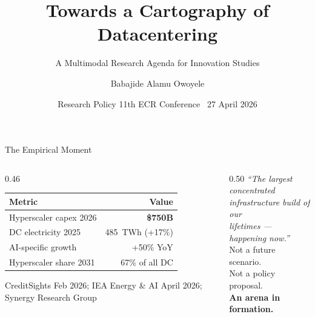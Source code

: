 \documentclass[aspectratio=169,11pt]{beamer}
\title{Towards a Cartography of Datacentering}
\subtitle{A Multimodal Research Agenda for Innovation Studies}
\author{Babajide Alamu Owoyele}
\institute{DRIFT, Erasmus University Rotterdam \textbar\ Radboud University}
\date{Research Policy 11th ECR Conference \textbar\ 27 April 2026}
\newcommand{\iconfull}[2]{\textcolor{#1}{\faIcon{#2}}}
\newcommand{\hl}[1]{\textcolor{dchighlight}{\textbf{#1}}}
\begin{document}
\begin{frame}[shrink=4]
\titlepage
\end{frame}

\begin{frame}{\iconfull{dcblue}{chart-bar}\enspace The Empirical Moment}
\begin{columns}[T]
\begin{column}{0.46\textwidth}
  \vspace{0.3em}
  \begin{tabular}{@{}lr@{}}
    \toprule
    \textbf{Metric} & \textbf{Value} \\
    \midrule
    Hyperscaler capex 2026   & \textbf{\$750B} \\
    DC electricity 2025      & 485~TWh (+17\%) \\
    AI-specific growth       & +50\% YoY \\
    Hyperscaler share 2031   & 67\% of all DC \\
    \bottomrule
  \end{tabular}
  \vspace{0.5em}

  \scriptsize\textcolor{dcgray}{CreditSights Feb 2026; IEA Energy \& AI April 2026;
  Synergy Research Group}
\end{column}
\begin{column}{0.50\textwidth}
  \vspace{0.5em}
  \large\textit{``The largest concentrated\\
  infrastructure build of our\\
  lifetimes — happening now.''}\\[0.6em]
  \normalsize
  Not a future scenario.\\
  Not a policy proposal.\\[0.4em]
  \hl{An arena in formation.}
\end{column}
\end{columns}
\end{frame}
\end{document}
